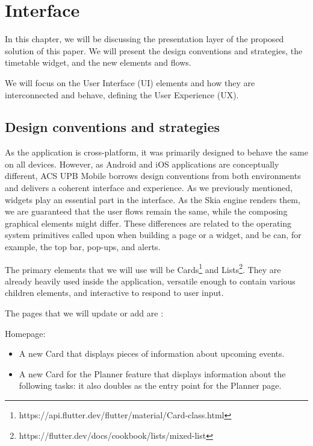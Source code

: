 \chapter{Interface} \label{chapter4}

In this chapter, we will be discussing the presentation layer of the proposed solution of this paper. We will present the design conventions and strategies, the timetable widget, and the new elements and flows. 

We will focus on the User Interface (UI) elements and how they are interconnected and behave, defining the User Experience (UX).

\section{Design conventions and strategies} \label{5:conv}

As the application is cross-platform, it was primarily designed to behave the same on all devices. However, as Android and iOS applications are conceptually different, ACS UPB Mobile borrows design conventions from both environments \cite{apple2020human} and delivers a coherent interface and experience.
As we previously mentioned, widgets play an essential part in the interface. As the Skia engine renders them, we are guaranteed that the user flows remain the same, while the composing graphical elements might differ. These differences are related to the operating system primitives called upon when building a page or a widget, and be can, for example, the top bar, pop-ups, and alerts.

The primary elements that we will use will be Cards\footnote{https://api.flutter.dev/flutter/material/Card-class.html} and Lists\footnote{https://flutter.dev/docs/cookbook/lists/mixed-list}. They are already heavily used inside the application, versatile enough to contain various children elements, and interactive to respond to user input. 
\clearpage

The pages that we will update or add are : 
~

Homepage: 
\begin{itemize}
            \setlength{\topsep}{0.5pt}
            \setlength{\itemsep}{0.5pt}
            \setlength{\parsep}{0.5pt}
            \item A new Card that displays pieces of information about upcoming events.
            \item A new Card for the Planner feature that displays information about the following tasks: it also doubles as the entry point for the  Planner page.
\end{itemize}

